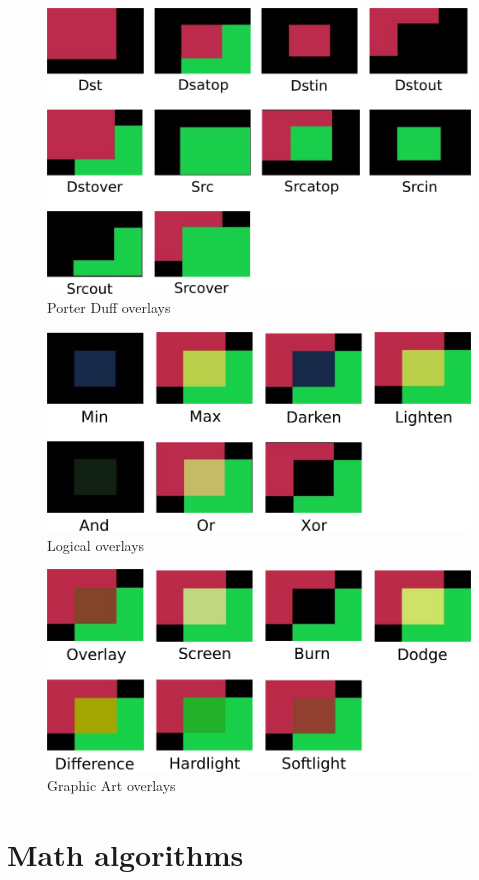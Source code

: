 \begin{figure}[htpb]
    \centering
    \includegraphics[width=0.84\linewidth]{images/porter-duff.png}
    \caption{Porter Duff overlays}
\end{figure}

\begin{figure}[htpb]
    \centering
    \includegraphics[width=0.84\linewidth]{images/logical.png}
    \caption{Logical overlays}
\end{figure}

\begin{figure}[htpb]
    \centering
    \includegraphics[width=0.84\linewidth]{images/graphic-art.png}
    \caption{Graphic Art overlays}
\end{figure}

\section{Math algorithms}%
\label{sec:math_algorithms}

